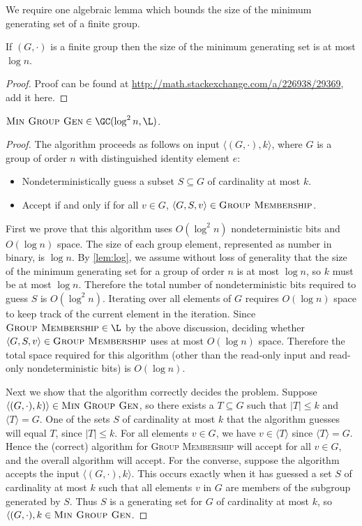 \documentclass{article}
\newcommand{\gen}[1]{{\langle #1 \rangle}}
\begin{document}
We require one algebraic lemma which bounds the size of the minimum generating set of a finite group.

\begin{lemma}\label{lem:log}
  If $(G, \cdot)$ is a finite group then the size of the minimum generating set is at most $\log n$.
\end{lemma}
\begin{proof}
  Proof can be found at \url{http://math.stackexchange.com/a/226938/29369}, add it here.
\end{proof}

\begin{lemma}\label{lem:mingengc}
  $\textsc{Min Group Gen} \in \GC(\log^2 n, \L)$.
\end{lemma}
\begin{proof}
  The algorithm proceeds as follows on input $\langle (G, \cdot), k \rangle$, where $G$ is a group of order $n$ with distinguished identity element $e$:
  \begin{itemize}
  \item Nondeterministically guess a subset $S \subseteq G$ of cardinality at most $k$.
  \item Accept if and only if for all $v \in G$, $\langle G, S, v \rangle \in \textsc{Group Membership}$.
  \end{itemize}

  First we prove that this algorithm uses $O(\log^2 n)$ nondeterministic bits and $O(\log n)$ space.
  The size of each group element, represented as number in binary, is $\log n$.
  By \autoref{lem:log}, we assume without loss of generality that the size of the minimum generating set for a group of order $n$ is at most $\log n$, so $k$ must be at most $\log n$.
  Therefore the total number of nondeterministic bits required to guess $S$ is $O(\log^2 n)$.
  Iterating over all elements of $G$ requires $O(\log n)$ space to keep track of the current element in the iteration.
  Since $\textsc{Group Membership} \in \L$ by the above discussion, deciding whether $\langle G, S, v \rangle \in \textsc{Group Membership}$ uses at most $O(\log n)$ space.
  Therefore the total space required for this algorithm (other than the read-only input and read-only nondeterministic bits) is $O(\log n)$.

  Next we show that the algorithm correctly decides the problem.
  Suppose $\langle (G, \cdot), k) \rangle \in \textsc{Min Group Gen}$, so there exists a $T \subseteq G$ such that $|T| \leq k$ and $\gen{T} = G$.
  One of the sets $S$ of cardinality at most $k$ that the algorithm guesses will equal $T$, since $|T| \leq k$.
  For all elements $v \in G$, we have $v \in \gen{T}$ since $\gen{T} = G$.
  Hence the (correct) algorithm for \textsc{Group Membership} will accept for all $v \in G$, and the overall algorithm will accept.
  For the converse, suppose the algorithm accepts the input $\langle (G, \cdot), k \rangle$.
  This occurs exactly when it has guessed a set $S$ of cardinality at most $k$ such that all elements $v$ in $G$ are members of the subgroup generated by $S$.
  Thus $S$ is a generating set for $G$ of cardinality at most $k$, so $\langle (G, \cdot), k \in \textsc{Min Group Gen}$.
\end{proof}
\end{document}
